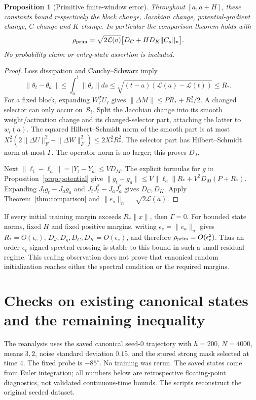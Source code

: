 \documentclass[10pt]{article}
\newtheorem{proposition}[theorem]{Proposition}
\begin{document}
\begin{proposition}[Primitive finite-window error]\label{prop:primitive}
Throughout $[a,a+H]$, these constants bound respectively the block change,
Jacobian change, potential-gradient change, $C$ change and $K$ change.
In particular the comparison theorem holds with
\begin{equation}\label{eq:primitive}
 \rho_{\rm prim}=\sqrt{2\mathcal L(a)}
       \big[D_C+H D_K\|C_a\|_n\big].
\end{equation}
No probability claim or entry-state assertion is included.
\end{proposition}
\begin{proof}
Loss dissipation and Cauchy--Schwarz imply
\[
 \|\theta_t-\theta_a\|\le\int_a^t\|\dot\theta_s\|ds
 \le\sqrt{(t-a)(\mathcal L(a)-\mathcal L(t))}\le R_*.
\]
For a fixed block, expanding $W_I^TU_I$ gives
$\|\Delta M\|\le PR_*+R_*^2/2$.
A changed selector can only occur on $\mathcal B_i$. Split the Jacobian
change into its smooth weight/activation change and its changed-selector
part, attaching the latter to $w_i(a)$. The squared Hilbert--Schmidt norm
of the smooth part is at most
$X_*^2(2\|\Delta U\|_F^2+\|\Delta W\|_F^2)\le2X_*^2R_*^2$.
The selector part has Hilbert--Schmidt norm at most $\Gamma$.
The operator norm is no larger; this proves $D_J$.

Next $\|\ell_t-\ell_a\|=|Y_t-Y_a|\le V D_M$.
The explicit formulas for $g$ in Proposition~\ref{prop:potential} give
$\|g_t-g_a\|\le V\|\ell_a\|R_*+V^2D_M(P+R_*)$.
Expanding $J_tg_t-J_ag_a$ and $J_tJ_t^*-J_aJ_a^*$ gives $D_C,D_K$.
Apply Theorem~\ref{thm:comparison} and $\|e_a\|_n=\sqrt{2\mathcal L(a)}$.
\end{proof}
If every initial training margin exceeds $R_*\|x\|$, then $\Gamma=0$.
For bounded state norms, fixed $H$ and fixed positive margins, writing
$\epsilon_e=\|e_a\|_n$ gives $R_*=O(\epsilon_e)$,
$D_J,D_g,D_C,D_K=O(\epsilon_e)$, and therefore
$\rho_{\rm prim}=O(\epsilon_e^2)$. Thus an order-$\epsilon_e$ signed
spectral crossing is stable to this bound in such a small-residual regime.
This scaling observation does not prove that canonical random initialization
reaches either the spectral condition or the required margins.

\section{Checks on existing canonical states and the remaining inequality}
The reanalysis uses the saved canonical seed-$0$ trajectory with $h=200$,
$N=4000$, means $3,2$, noise standard deviation $0.15$, and the stored strong
mask selected at time $4$. The fixed probe is $-85^\circ$.
No training was rerun. The saved states come from Euler integration;
all numbers below are retrospective floating-point diagnostics, not validated
continuous-time bounds. The scripts reconstruct the original seeded dataset.
\end{document}
